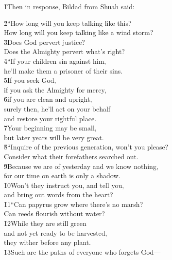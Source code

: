 \v{1}Then in response, Bildad from Shuah said:

\begin{poetry}
\poeml \v{2}``How long will you keep talking like this? \\
\poemll    How long will you keep talking like a wind storm? \\
\poeml \v{3}Does God pervert justice? \\
\poemll    Does the Almighty pervert what's right? \\
\poeml \v{4}``If your children sin against him, \\
\poemll    he'll make them a prisoner of their sins. \\
\poeml \v{5}If you seek God, \\
\poemll    if you ask the Almighty for mercy, \\
\poeml \v{6}if you are clean and upright, \\
\poemll    surely then, he'll act on your behalf \\
\poemlll       and restore your rightful place. \\
\poeml \v{7}Your beginning may be small, \\
\poemll    but later years will be very great. \\
\poeml \v{8}``Inquire of the previous generation, won't you please? \\
\poemll    Consider what their forefathers searched out. \\
\poeml \v{9}Because we are of yesterday and we know nothing, \\
\poemll    for our time on earth is only a shadow. \\
\poeml \v{10}Won't they instruct you, and tell you, \\
\poemll    and bring out words from the heart? \\
\poeml \v{11}``Can papyrus grow where there's no marsh? \\
\poemll    Can reeds flourish without water? \\
\poeml \v{12}While they are still green \\
\poemll    and not yet ready to be harvested, \\
\poemlll       they wither before any plant. \\
\poeml \v{13}Such are the paths of everyone who forgets God--- \\

\end{poetry}
